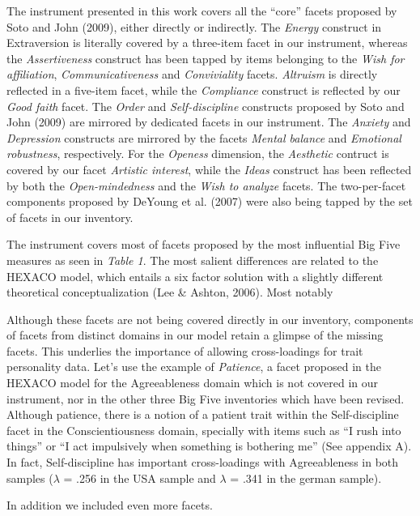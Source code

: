 \documentclass[,man,floatsintext]{apa6}
\theoremstyle{definition}
\theoremstyle{definition}
\theoremstyle{definition}
\theoremstyle{remark}
\begin{document}
The instrument presented in this work covers all the \enquote{core}
facets proposed by Soto and John (2009), either directly or indirectly.
The \emph{Energy} construct in Extraversion is literally covered by a
three-item facet in our instrument, whereas the \emph{Assertiveness}
construct has been tapped by items belonging to the \emph{Wish for
affiliation}, \emph{Communicativeness} and \emph{Conviviality} facets.
\emph{Altruism} is directly reflected in a five-item facet, while the
\emph{Compliance} construct is reflected by our \emph{Good faith} facet.
The \emph{Order} and \emph{Self-discipline} constructs proposed by Soto
and John (2009) are mirrored by dedicated facets in our instrument. The
\emph{Anxiety} and \emph{Depression} constructs are mirrored by the
facets \emph{Mental balance} and \emph{Emotional robustness},
respectively. For the \emph{Openess} dimension, the \emph{Aesthetic}
contruct is covered by our facet \emph{Artistic interest}, while the
\emph{Ideas} construct has been reflected by both the
\emph{Open-mindedness} and the \emph{Wish to analyze} facets. The
two-per-facet components proposed by DeYoung et al. (2007) were also
being tapped by the set of facets in our inventory.

The instrument covers most of facets proposed by the most influential
Big Five measures as seen in \emph{Table 1}. The most salient
differences are related to the HEXACO model, which entails a six factor
solution with a slightly different theoretical conceptualization (Lee \&
Ashton, 2006). Most notably

Although these facets are not being covered directly in our inventory,
components of facets from distinct domains in our model retain a glimpse
of the missing facets. This underlies the importance of allowing
cross-loadings for trait personality data. Let's use the example of
\emph{Patience}, a facet proposed in the HEXACO model for the
Agreeableness domain which is not covered in our instrument, nor in the
other three Big Five inventories which have been revised. Although
patience, there is a notion of a patient trait within the
Self-discipline facet in the Conscientiousness domain, specially with
items such as \enquote{I rush into things} or \enquote{I act impulsively
when something is bothering me} (See appendix A). In fact,
Self-discipline has important cross-loadings with Agreeableness in both
samples (\(\lambda\) = .256 in the USA sample and \(\lambda\) = .341 in
the german sample).

In addition we included even more facets.
\end{document}
